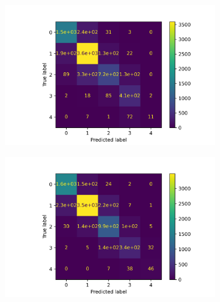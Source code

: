 \begin{figure}[H]
\begin{subfigure}{.49\textwidth}
  \centering
  \includegraphics[width=\linewidth]{baggingConfusionMatrix.png} 
  \caption{}
  \label{subfig:bagging}
\end{subfigure}
\begin{subfigure}{.49\textwidth}
  \centering
  \includegraphics[width=\linewidth]{mlpConfusionMatrix.png}  
  \caption{}
  \label{subfig:ann}
\end{subfigure}


\end{figure}
